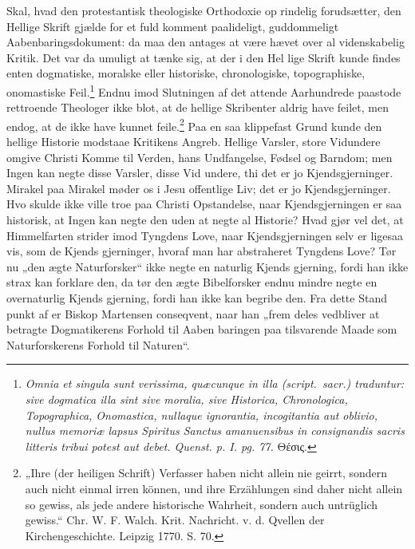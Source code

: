 \documentclass[12pt]{book}
\newcommand{\opage}[1]{\marginnote{\footnotesize\textit{[#1]}}}
\begin{document}
Skal, hvad den protestantisk theologiske Orthodoxie op\-%
rindelig forudsætter, den Hellige Skrift gjælde for et fuld\-%
komment paalideligt, guddommeligt Aabenbaringsdokument:
da maa den antages at være hævet over al videnskabelig
Kritik. Det var da umuligt at tænke sig, at der i den Hel\-%
lige Skrift kunde findes enten dogmatiske, moralske eller
historiske, chronologiske, topographiske, onomastiske Feil.\footnote{\textit{Omnia
et singula sunt verissima, quæcunque in illa (script.\ sacr.) traduntur:
sive dogmatica illa sint sive moralia, sive Historica, Chronologica,
Topographica, Onomastica, nullaque ignorantia, incogitantia aut
oblivio, nullus memoriæ lapsus Spiritus Sanctus
amanuensibus in consignandis sacris litteris tribui potest aut debet.
Quenst. p. I. pg. 77.} Θέσις.}
Endnu imod Slutningen af det attende Aarhundrede paastode
rettroende Theologer ikke blot, at de hellige Skribenter aldrig
have feilet, men endog, at de ikke have kunnet feile.\footnote{„Ihre
(der heiligen Schrift) Verfasser haben nicht allein nie geirrt, sondern
auch nicht einmal irren können, und ihre Erzählungen sind daher nicht
allein so gewiss, als jede andere historische Wahrheit, sondern auch
untrüglich gewiss.“ Chr. W. F. Walch. Krit. Nachricht. v. d. Qvellen
der Kirchengeschichte. Leipzig 1770. S. 70.} Paa
en saa klippefast Grund kunde den hellige Historie modstaae
Kritikens Angreb. Hellige Varsler, store Vidundere omgive
Christi Komme til Verden, hans Undfangelse, Fødsel og
Barndom; men Ingen kan negte disse Varsler, disse Vid\-%
\opage{47}\setcounter{footnote}{0}%
undere, thi det er jo Kjendsgjerninger. Mirakel paa Mirakel
møder os i Jesu offentlige Liv; det er jo Kjendsgjerninger. Hvo
skulde ikke ville troe paa Christi Opstandelse, naar Kjendsgjerningen
er saa historisk, at Ingen kan negte den uden at negte al Historie?
Hvad gjør vel det, at Himmelfarten strider imod Tyngdens
Love, naar Kjendsgjerningen selv er ligesaa vis, som de Kjends\-%
gjerninger, hvoraf man har abstraheret Tyngdens Love? Tør
nu „den ægte Naturforsker“ ikke negte en naturlig Kjends\-%
gjerning, fordi han ikke strax kan forklare den, da tør den
ægte Bibelforsker endnu mindre negte en overnaturlig Kjends\-%
gjerning, fordi han ikke kan begribe den. Fra dette Stand\-%
punkt af er Biskop Martensen conseqvent, naar han „frem\-%
deles vedbliver at betragte Dogmatikerens Forhold til Aaben\-%
baringen paa tilsvarende Maade som Naturforskerens Forhold
til Naturen“.
\end{document}
